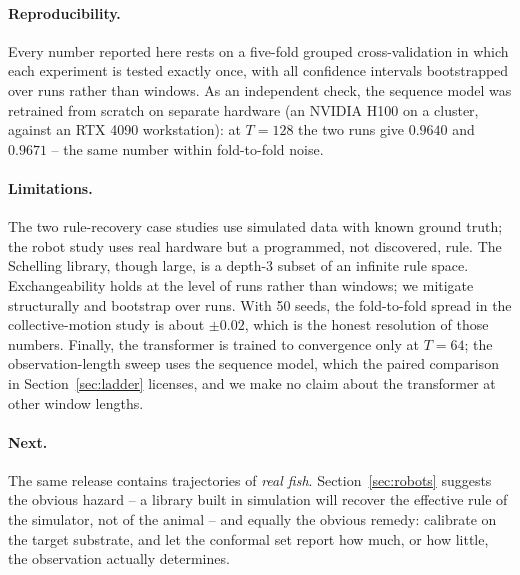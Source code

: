 \documentclass[11pt]{article}
\begin{document}
\paragraph{Reproducibility.}
Every number reported here rests on a five-fold grouped cross-validation in which each
experiment is tested exactly once, with all confidence intervals bootstrapped over
runs rather than windows. As an independent check, the sequence model was retrained
from scratch on separate hardware (an NVIDIA H100 on a cluster, against an RTX 4090
workstation): at $T=128$ the two runs give $0.9640$ and $0.9671$ -- the same number
within fold-to-fold noise.

\paragraph{Limitations.}
The two rule-recovery case studies use simulated data with known ground truth; the
robot study uses real hardware but a programmed, not discovered, rule. The Schelling
library, though large, is a depth-3 subset of an infinite rule space. Exchangeability
holds at the level of runs rather than windows; we mitigate structurally and bootstrap
over runs. With 50 seeds, the fold-to-fold spread in the collective-motion study is
about $\pm 0.02$, which is the honest resolution of those numbers. Finally, the
transformer is trained to convergence only at $T=64$; the observation-length sweep
uses the sequence model, which the paired comparison in Section~\ref{sec:ladder}
licenses, and we make no claim about the transformer at other window lengths.

\paragraph{Next.}
The same release contains trajectories of \emph{real fish}. Section~\ref{sec:robots}
suggests the obvious hazard -- a library built in simulation will recover the effective
rule of the simulator, not of the animal -- and equally the obvious remedy: calibrate on
the target substrate, and let the conformal set report how much, or how little, the
observation actually determines.
\end{document}
